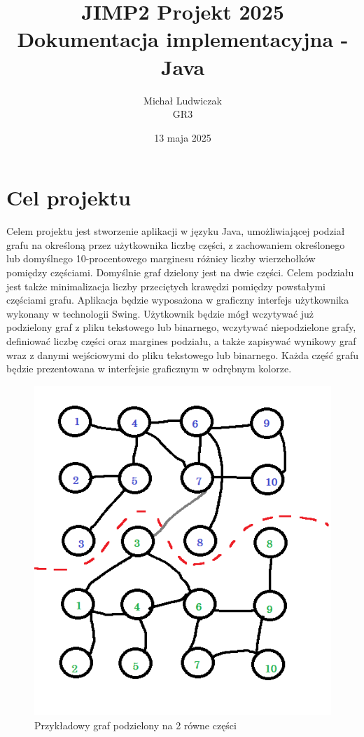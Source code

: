 \documentclass{article}
\title{\Huge JIMP2 Projekt 2025 \\ {\huge Dokumentacja implementacyjna - Java}}
\author{Michał Ludwiczak \\ GR3}
\date{13 maja 2025}
\begin{document}
\maketitle

\tableofcontents



\section{Cel projektu}

    Celem projektu jest stworzenie aplikacji w języku Java, umożliwiającej podział grafu na określoną przez użytkownika liczbę części, z zachowaniem określonego lub domyślnego 10-procentowego marginesu różnicy liczby wierzchołków pomiędzy częściami. Domyślnie graf dzielony jest na dwie części. Celem podziału jest także minimalizacja liczby przeciętych krawędzi pomiędzy powstałymi częściami grafu. 
    Aplikacja będzie wyposażona w graficzny interfejs użytkownika wykonany w technologii Swing. Użytkownik będzie mógł wczytywać już podzielony graf z pliku tekstowego lub binarnego, wczytywać niepodzielone grafy, definiować liczbę części oraz margines podziału, a także zapisywać wynikowy graf wraz z danymi wejściowymi do pliku tekstowego lub binarnego. 
    Każda część grafu będzie prezentowana w interfejsie graficznym w odrębnym kolorze.
    
    \begin{figure}[H]
        \centering
        \includegraphics[width=0.75\linewidth]{img/graph.png}
        \caption{Przykładowy graf podzielony na 2 równe części}
        \label{fig:graph}
    \end{figure}
\end{document}
